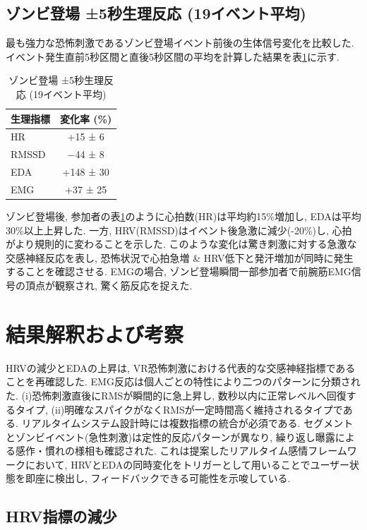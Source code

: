 \documentclass[a4paper]{jarticle}
\begin{document}
\subsection{ゾンビ登場 ±5秒生理反応 (19イベント平均)}

最も強力な恐怖刺激であるゾンビ登場イベント前後の生体信号変化を比較した.イベント発生直前5秒区間と直後5秒区間の平均を計算した結果を表\ref{table3}に示す. 

\begin{table}[htbp]
\centering
\caption{ゾンビ登場 ±5秒生理反応 (19イベント平均)}
\label{table3}
\small
\begin{tabular}{|l|c|}
\hline
\textbf{生理指標} & \textbf{変化率 (\%)} \\
\hline
HR & +15 ± 6 \\
\hline
RMSSD & −44 ± 8 \\
\hline
EDA & +148 ± 30 \\
\hline
EMG & +37 ± 25 \\
\hline
\end{tabular}
\end{table}

ゾンビ登場後, 参加者の表\ref{table3}のように心拍数(HR)は平均約15\%増加し, EDAは平均30\%以上上昇した. 一方, HRV(RMSSD)はイベント後急激に減少(-20\%)し, 心拍がより規則的に変わることを示した. このような変化は驚き刺激に対する急激な交感神経反応を表し, 恐怖状況で心拍急増 \& HRV低下と発汗増加が同時に発生することを確認させる. EMGの場合, ゾンビ登場瞬間一部参加者で前腕筋EMG信号の頂点が観察され, 驚く筋反応を捉えた.

\section{結果解釈および考察}%

HRVの減少とEDAの上昇は, VR恐怖刺激における代表的な交感神経指標であることを再確認した. EMG反応は個人ごとの特性により二つのパターンに分類された. (i)恐怖刺激直後にRMSが瞬間的に急上昇し, 数秒以内に正常レベルへ回復するタイプ, (ii)明確なスパイクがなくRMSが一定時間高く維持されるタイプである. リアルタイムシステム設計時には複数指標の統合が必須である. セグメントとゾンビイベント(急性刺激)は定性的反応パターンが異なり, 繰り返し曝露による感作・慣れの様相も確認された. これは提案したリアルタイム感情フレームワークにおいて, HRVとEDAの同時変化をトリガーとして用いることでユーザー状態を即座に検出し, フィードバックできる可能性を示唆している.
\subsection{HRV指標の減少}
\end{document}
